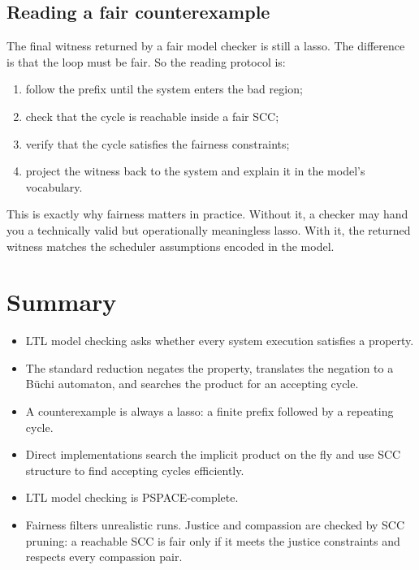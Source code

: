 \subsection{Reading a fair counterexample}

The final witness returned by a fair model checker is still a lasso.  The
difference is that the loop must be fair.  So the reading protocol is:
\begin{enumerate}
  \item follow the prefix until the system enters the bad region;
  \item check that the cycle is reachable inside a fair SCC;
  \item verify that the cycle satisfies the fairness constraints;
  \item project the witness back to the system and explain it in the model's
        vocabulary.
\end{enumerate}

This is exactly why fairness matters in practice.  Without it, a checker may
hand you a technically valid but operationally meaningless lasso.  With it,
the returned witness matches the scheduler assumptions encoded in the model.

\section{Summary}
\label{sec:ltl-mc-summary}

\begin{summarybox}
\begin{itemize}[nosep]
  \item LTL model checking asks whether every system execution satisfies a
        property.
  \item The standard reduction negates the property, translates the negation
        to a B\"uchi automaton, and searches the product for an accepting
        cycle.
  \item A counterexample is always a lasso: a finite prefix followed by a
        repeating cycle.
  \item Direct implementations search the implicit product on the fly and use
        SCC structure to find accepting cycles efficiently.
  \item LTL model checking is PSPACE-complete.
  \item Fairness filters unrealistic runs.  Justice and compassion are
        checked by SCC pruning: a reachable SCC is fair only if it meets the
        justice constraints and respects every compassion pair.
\end{itemize}
\end{summarybox}

